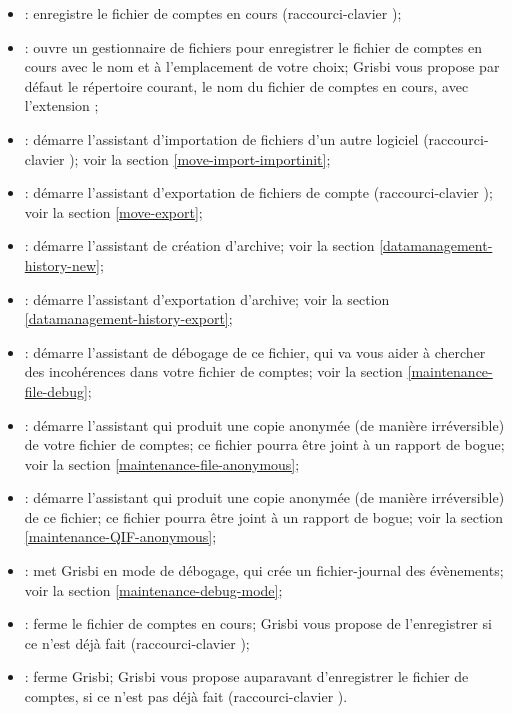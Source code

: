 \begin{itemize}
	\item {}: enregistre le fichier de comptes en cours (raccourci-clavier );
	\item {}: ouvre un gestionnaire de fichiers pour enregistrer le fichier de comptes en cours avec le nom et à l'emplacement de votre choix; Grisbi vous propose par défaut le répertoire courant, le nom du fichier de comptes en cours, avec l'\gls{extension} ;
	\item {}: démarre l'assistant d'importation de fichiers d'un autre logiciel (raccourci-clavier ); voir la section \vref{move-import-importinit};
	\item {}: démarre l'assistant d'exportation de fichiers de compte (raccourci-clavier ); voir la section \vref{move-export};	
	\item {}: démarre l'assistant de création d'archive; voir la section \vref{datamanagement-history-new};	
	\item {}: démarre l'assistant d'exportation d'archive; voir la section \vref{datamanagement-history-export};
	\item {}: démarre l'assistant de débogage de ce fichier, qui va vous aider à chercher des incohérences dans votre fichier de comptes; voir la section \vref{maintenance-file-debug};
	\item {}: démarre l'assistant qui produit une copie anonymée (de manière irréversible) de votre fichier de comptes; ce fichier pourra être joint à un rapport de bogue; voir la section \vref{maintenance-file-anonymous};	
	\item {}: démarre l'assistant qui produit une copie anonymée (de manière irréversible) de ce fichier; ce fichier pourra être joint à un rapport de bogue; voir la section \vref{maintenance-QIF-anonymous};	
	\item {}: met Grisbi en mode de débogage, qui crée un fichier-journal des évènements; voir la section \vref{maintenance-debug-mode}; 	
	\item {}: ferme le fichier de comptes en cours; Grisbi vous propose de l'enregistrer si ce n'est déjà fait (raccourci-clavier );
	\item {}: ferme Grisbi; Grisbi vous propose auparavant d'enregistrer le fichier de comptes, si ce n'est pas déjà fait (raccourci-clavier ).
\end{itemize}

